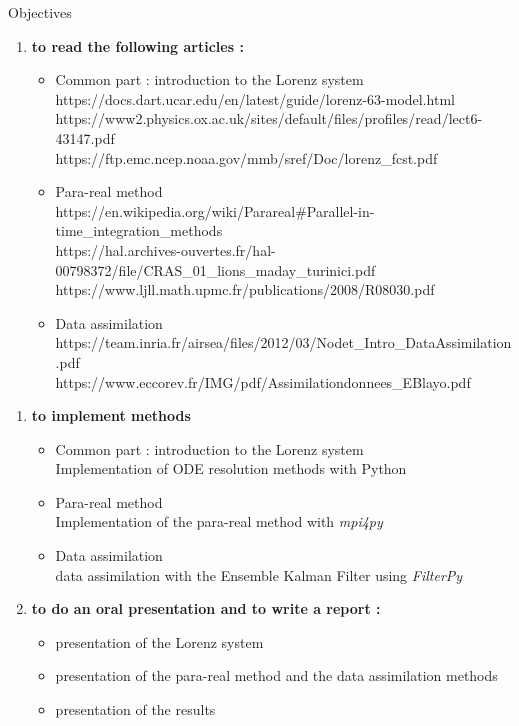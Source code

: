 \documentclass[10pt,xcolor={table,dvipsnames},t]{beamer}
\begin{document}
	\begin{frame}[allowframebreaks]{Objectives}
		
		\begin{enumerate}[\textbullet]
			\item \textbf{to read the following articles :}
			\begin{itemize}
				\item Common part : introduction to the Lorenz system \\
				\quad https://docs.dart.ucar.edu/en/latest/guide/lorenz-63-model.html \\
				\quad https://www2.physics.ox.ac.uk/sites/default/files/profiles/read/lect6-43147.pdf \\
				\quad https://ftp.emc.ncep.noaa.gov/mmb/sref/Doc/lorenz\_fcst.pdf
				\item Para-real method \\
				\quad https://en.wikipedia.org/wiki/Parareal\#Parallel-in-time\_integration\_methods \\
				\quad https://hal.archives-ouvertes.fr/hal-00798372/file/CRAS\_01\_lions\_maday\_turinici.pdf \\
				\quad https://www.ljll.math.upmc.fr/publications/2008/R08030.pdf
				\item Data assimilation \\
				\quad https://team.inria.fr/airsea/files/2012/03/Nodet\_Intro\_DataAssimilation.pdf \\
				\quad https://www.eccorev.fr/IMG/pdf/Assimilationdonnees\_EBlayo.pdf
			\end{itemize}
		\end{enumerate}	 	
	
		\newpage
		
		\newpage

		\begin{enumerate}[\textbullet]
			\item \textbf{to implement methods} 
			\begin{itemize}
				\item Common part : introduction to the Lorenz system \\
				\quad Implementation of ODE resolution methods with Python
				\item Para-real method \\
				\quad Implementation of the para-real method with \textit{mpi4py}
				\item Data assimilation \\
				\quad data assimilation with the Ensemble Kalman Filter using \textit{FilterPy}
			\end{itemize}
			\item \textbf{to do an oral presentation and to write a report :}
			\begin{itemize}
				\item presentation of the Lorenz system
				\item presentation of the para-real method and the data assimilation methods
				\item presentation of the results
			\end{itemize}
		\end{enumerate}
	\end{frame}
	
\end{document}
